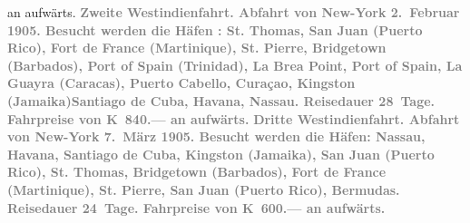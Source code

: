 {\begin{ledgroupsized}[t]{13cm}
{{                  an aufwärts.}}\pend
           \pstart
           \textcolor{gray}{\textbf{\textbf{Zweite Westindienfahrt.} Abfahrt von New-York { }\textbf{2. Februar 1905}. Besucht werden die Häfen : St. Thomas,
                     San Juan (Puerto Rico), Fort de France (Martinique), St. Pierre, Bridgetown (Barbados), Port of Spain (Trinidad), La Brea Point, Port of
                     Spain, La Guayra (Caracas), Puerto Cabello, Curaçao, Kingston (Jamaika)Santiago de Cuba, Havana, Nassau. Reisedauer 28 Tage.
                  Fahrpreise von \textbf{K 840.—} an aufwärts.}}\pend
           \pstart
           \textcolor{gray}{\textbf{\textbf{Dritte Westindienfahrt.} Abfahrt von New-York { }\textbf{7. März 1905}. Besucht werden die Häfen: Nassau, Havana, Santiago
                     de Cuba, Kingston (Jamaika), San Juan (Puerto Rico), St. Thomas, Bridgetown
                     (Barbados), Fort de France
                  (Martinique), St. Pierre, San Juan (Puerto Rico), Bermudas. Reisedauer 24 Tage. Fahrpreise von \textbf{K 600.—}
                  an aufwärts.}}\pend
           \pstart

\end{ledgroupsized}}
